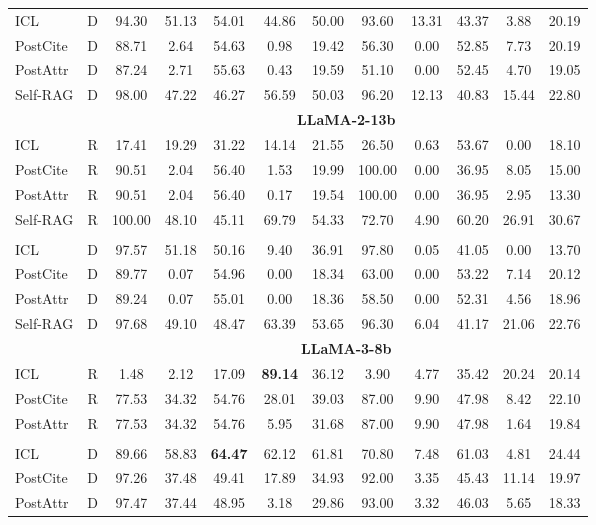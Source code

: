 \documentclass{article} %
\begin{document}
\begin{table}[htb!]
{\begin{tabular}{l*{11}{c}}
ICL & D & 94.30 & 51.13 & 54.01 & 44.86 & 50.00 & 93.60 & 13.31 & 43.37 & 3.88 & 20.19  \\
PostCite & D & 88.71 & 2.64 & 54.63 & 0.98 & 19.42 & 56.30 & 0.00 & 52.85 & 7.73 & 20.19 \\
PostAttr & D & 87.24 & 2.71 & 55.63 & 0.43 & 19.59 & 51.10 & 0.00 & 52.45 & 4.70 & 19.05 \\
Self-RAG & D & 98.00 & 47.22 & 46.27 & 56.59 & 50.03 & 96.20 & 12.13 & 40.83 & 15.44 & 22.80 \\
& & \multicolumn{10}{c}{\cellcolor[gray]{0.9}\textbf{LLaMA-2-13b}} \\
ICL & R & 17.41 & 19.29 & 31.22 & 14.14 & 21.55 & 26.50 & 0.63 & 53.67 & 0.00 & 18.10 \\
PostCite & R & 90.51 & 2.04 & 56.40 & 1.53 & 19.99 & 100.00 & 0.00 & 36.95 & 8.05 & 15.00 \\
PostAttr & R & 90.51 & 2.04 & 56.40 & 0.17 & 19.54 & 100.00 & 0.00 & 36.95 & 2.95 & 13.30 \\
Self-RAG& R & 100.00 & 48.10 & 45.11 & 69.79 & 54.33 & 72.70 & 4.90 & 60.20 & 26.91 & 30.67 \\\\

ICL & D & 97.57 & 51.18 & 50.16 & 9.40 & 36.91 & 97.80 & 0.05 & 41.05 & 0.00 & 13.70 \\
PostCite & D & 89.77 & 0.07 & 54.96 & 0.00 & 18.34 & 63.00 & 0.00 & 53.22 & 7.14 & 20.12 \\
PostAttr & D & 89.24 & 0.07 & 55.01 & 0.00 & 18.36 & 58.50 & 0.00 & 52.31 & 4.56 & 18.96 \\
Self-RAG & D & 97.68 & 49.10 & 48.47 & 63.39 & 53.65 & 96.30 & 6.04 & 41.17 & 21.06 & 22.76 \\
& & \multicolumn{10}{c}{\cellcolor[gray]{0.9}\textbf{LLaMA-3-8b}} \\
ICL & R & 1.48 & 2.12 & 17.09 & \bf{89.14} & 36.12 & 3.90 & 4.77 & 35.42 & 20.24 & 20.14 \\
PostCite & R & 77.53 & 34.32 & 54.76 & 28.01 & 39.03 & 87.00 & 9.90 & 47.98 & 8.42 & 22.10 \\
PostAttr & R & 77.53 & 34.32 & 54.76 & 5.95 & 31.68 & 87.00 & 9.90 & 47.98 & 1.64 & 19.84 \\\\

ICL & D & 89.66 & 58.83 & \bf 64.47 & 62.12 & 61.81 & 70.80 & 7.48 & 61.03 & 4.81 & 24.44 \\
PostCite & D & 97.26 & 37.48 & 49.41 & 17.89 & 34.93 & 92.00 & 3.35 & 45.43 & 11.14 & 19.97 \\
PostAttr & D & 97.47 & 37.44 & 48.95 & 3.18 & 29.86 & 93.00 & 3.32 & 46.03 & 5.65 & 18.33 \\


\end{tabular}}
\end{table}
\end{document}
